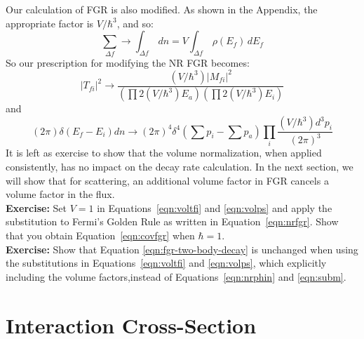 \documentclass[12pt]{article}
\begin{document}
Our calculation of FGR is also modified.  As shown in the Appendix,
the appropriate factor is $V/\hbar^3$, and so:
$$\sum_{\Delta f} \to \int_{\Delta f} \, dn = V \int_{\Delta f} \,
\rho(E_f) \, dE_f$$
So our prescription for modifying the NR FGR becomes:
\begin{equation}
\label{eqn:voltfi}
|T_{fi}|^2 \to \frac{(V/\hbar^3) |M_{fi}|^2}{(\prod 2 (V/\hbar^3) E_a) (\prod 2 (V/\hbar^3) E_i) }
\end{equation}
and
\begin{equation}
\label{eqn:volps}
(2\pi) \delta(E_f - E_i) dn \to (2 \pi)^4 \delta^4(\sum p_i - \sum p_a) \prod_i \frac{(V/\hbar^3) d^3 p_i}{(2\pi)^3}
\end{equation}
It is left as exercise to show that the volume normalization, when
applied consistently, has no impact on the decay rate calculation.  In
the next section, we will show that for scattering, an additional
volume factor in FGR cancels a volume factor in the flux.\\[4pt]

\noindent
{\bf Exercise:} Set $V=1$ in Equations~\ref{eqn:voltfi} and \ref{eqn:volps}
and apply the substitution to Fermi's Golden Rule as written in Equation~\ref{eqn:nrfgr}.  Show that you obtain Equation~\ref{eqn:covfgr} when $\hbar = 1$.\\[5pt]

\noindent
{\bf Exercise:} Show that Equation \ref{eqn:fgr-two-body-decay} is unchanged when using the substitutions in Equations~\ref{eqn:voltfi} and \ref{eqn:volps}, which explicitly including the volume factors,instead of Equations~\ref{eqn:nrphin} and \ref{eqn:subm}.\\[5pt]

\section{Interaction Cross-Section}
\end{document}
